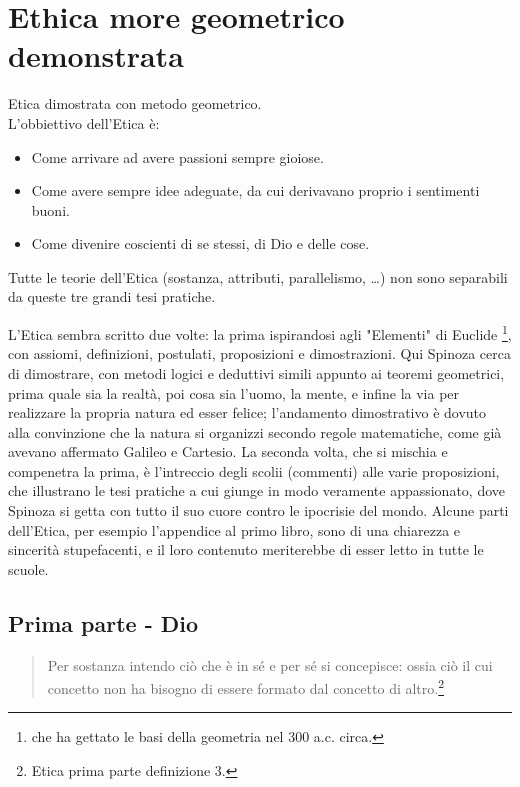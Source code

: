 \chapter[Etica]{Ethica more geometrico demonstrata}
Etica dimostrata con metodo geometrico.\\L'obbiettivo dell'Etica è:\begin{itemize}
	\item Come arrivare ad avere passioni sempre gioiose.
	\item Come avere sempre idee adeguate, da cui derivavano proprio i sentimenti buoni.
	\item Come divenire coscienti di se stessi, di Dio e delle cose.
\end{itemize}

Tutte le teorie dell'Etica (sostanza, attributi, parallelismo, \dots) non sono separabili da queste tre grandi tesi pratiche.

L'Etica sembra scritto due volte: la prima ispirandosi agli "Elementi" di Euclide \footnote{che ha gettato le basi della geometria nel 300 a.c. circa.}, con assiomi, definizioni, postulati, proposizioni e dimostrazioni. Qui Spinoza cerca di dimostrare, con metodi logici e deduttivi simili appunto ai teoremi geometrici, prima quale sia la realtà, poi cosa sia l'uomo, la mente, e infine la via per realizzare la propria natura ed esser felice; l'andamento dimostrativo è dovuto alla convinzione che la natura si organizzi secondo regole matematiche, come già avevano affermato Galileo e Cartesio. La seconda volta, che si mischia e compenetra la prima, è l'intreccio degli scolii (commenti) alle varie proposizioni, che illustrano le tesi pratiche a cui giunge in modo veramente appassionato, dove Spinoza si getta con tutto il suo cuore contro le ipocrisie del mondo. Alcune parti dell'Etica, per esempio l'appendice al primo libro, sono di una chiarezza e sincerità stupefacenti, e il loro contenuto meriterebbe di esser letto in tutte le scuole.
\newpage

\section{Prima parte - Dio}
\begin{quotation}
\small	Per sostanza intendo ciò che è in sé e per sé si concepisce: ossia ciò il cui concetto non ha bisogno di essere formato dal concetto di altro.\footnote{Etica prima parte definizione 3.}
\end{quotation}

